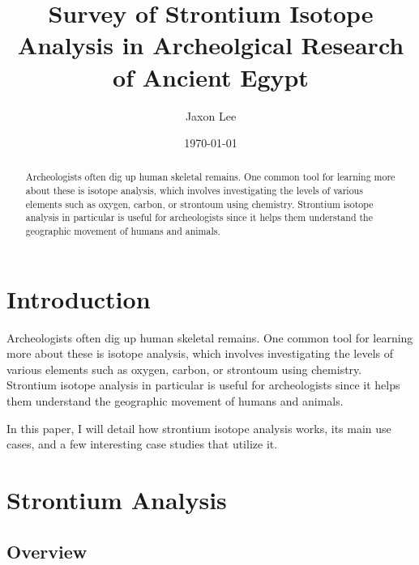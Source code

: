 \documentclass[a4paper, 12pt]{article}
\title{Survey of Strontium Isotope Analysis in Archeolgical Research of Ancient Egypt}
\author{Jaxon Lee}
\date{\today}
\begin{document}
\maketitle

\begin{abstract}
    Archeologists often dig up human skeletal remains. One common tool for learning
    more about these is isotope analysis, which involves investigating the levels of various
    elements such as oxygen, carbon, or strontoum using chemistry. Strontium isotope analysis
    in particular is useful for archeologists since it helps them understand the geographic
    movement of humans and animals.
\end{abstract}

\section{Introduction}
Archeologists often dig up human skeletal remains. One common tool for learning
more about these is isotope analysis, which involves investigating the levels of various
elements such as oxygen, carbon, or strontoum using chemistry. Strontium isotope analysis
in particular is useful for archeologists since it helps them understand the geographic
movement of humans and animals.

In this paper, I will detail how strontium isotope analysis works, its main
use cases, and a few interesting case studies that utilize it.


\section{Strontium Analysis}
\subsection{Overview}

\end{document}

